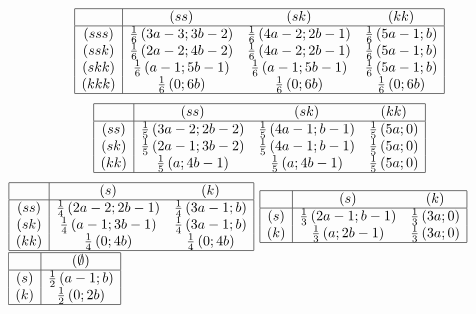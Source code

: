 \begin{solution}{6.28}
\[\begin{array}{|c|ccc|}  \hline {} & {\left(ss\right)} & {\left(sk\right)} & {\left(kk\right)} \\  \hline {\left(sss\right)} & {\frac{1}{6} \left(3a-3;3b-2\right)} & {\frac{1}{6} \left(4a-2;2b-1\right)} & {\frac{1}{6} \left(5a-1;b\right)} \\ {\left(ssk\right)} & {\frac{1}{6} \left(2a-2;4b-2\right)} & {\frac{1}{6} \left(4a-2;2b-1\right)} & {\frac{1}{6} \left(5a-1;b\right)} \\ {\left(skk\right)} & {\frac{1}{6} \left(a-1;5b-1\right)} & {\frac{1}{6} \left(a-1;5b-1\right)} & {\frac{1}{6} \left(5a-1;b\right)} \\ {\left(kkk\right)} & {\frac{1}{6} \left(0;6b\right)} & {\frac{1}{6} \left(0;6b\right)} & {\frac{1}{6} \left(0;6b\right)} \\  \hline  \end{array}\]
\[\begin{array}{|c|ccc|}  \hline {} & {\left(ss\right)} & {\left(sk\right)} & {\left(kk\right)} \\  \hline {\left(ss\right)} & {\frac{1}{5} \left(3a-2;2b-2\right)} & {\frac{1}{5} \left(4a-1;b-1\right)} & {\frac{1}{5} \left(5a;0\right)} \\ {\left(sk\right)} & {\frac{1}{5} \left(2a-1;3b-2\right)} & {\frac{1}{5} \left(4a-1;b-1\right)} & {\frac{1}{5} \left(5a;0\right)} \\ {\left(kk\right)} & {\frac{1}{5} \left(a;4b-1\right)} & {\frac{1}{5} \left(a;4b-1\right)} & {\frac{1}{5} \left(5a;0\right)} \\  \hline  \end{array}\]
 $\begin{array}{|c|cc|}  \hline {} & {\left(s\right)} & {\left(k\right)} \\  \hline {\left(ss\right)} & {\frac{1}{4} \left(2a-2;2b-1\right)} & {\frac{1}{4} \left(3a-1;b\right)} \\ {\left(sk\right)} & {\frac{1}{4} \left(a-1;3b-1\right)} & {\frac{1}{4} \left(3a-1;b\right)} \\ {\left(kk\right)} & {\frac{1}{4} \left(0;4b\right)} & {\frac{1}{4} \left(0;4b\right)} \\  \hline  \end{array}$  $\begin{array}{|c|cc|}  \hline {} & {\left(s\right)} & {\left(k\right)} \\  \hline {\left(s\right)} & {\frac{1}{3} \left(2a-1;b-1\right)} & {\frac{1}{3} \left(3a;0\right)} \\ {\left(k\right)} & {\frac{1}{3} \left(a;2b-1\right)} & {\frac{1}{3} \left(3a;0\right)} \\  \hline  \end{array}$  $\begin{array}{|c|c|}  \hline {} & {\left(\emptyset \right)} \\  \hline {\left(s\right)} & {\frac{1}{2} \left(a-1;b\right)} \\ {\left(k\right)} & {\frac{1}{2} \left(0;2b\right)} \\  \hline  \end{array}$
\end{solution}
